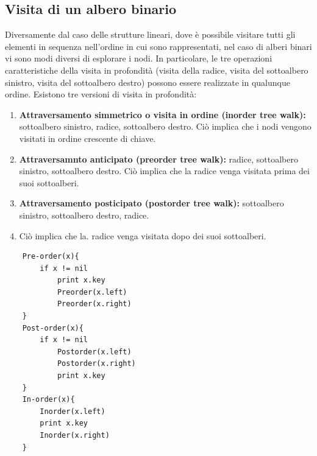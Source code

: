 \subsection{Visita di un albero binario}
Diversamente dal caso delle strutture lineari, dove è possibile visitare tutti gli elementi in
sequenza nell’ordine in cui sono rappresentati, nel caso di alberi binari vi sono modi diversi
di esplorare i nodi. In particolare, le tre operazioni caratteristiche della visita in profondità
(visita della radice, visita del sottoalbero sinistro, visita del sottoalbero destro) possono essere
realizzate in qualunque ordine. Esistono tre versioni di visita in profondità:
\begin{enumerate}
    \item \textbf{Attraversamento simmetrico o visita in ordine (inorder tree walk):} sottoalbero sinistro, 
    radice, sottoalbero destro. Ciò implica che i nodi vengono visitati in ordine crescente di chiave.
    \item \textbf{Attraversamnto anticipato (preorder tree walk):} radice, sottoalbero sinistro,  sottoalbero destro. 
    Ciò implica che la radice venga visitata prima dei suoi sottoalberi.
    \item \textbf{Attraversamento posticipato (postorder tree walk):} sottoalbero sinistro, sottoalbero destro, radice. 
    \item Ciò implica che la. radice venga visitata dopo dei suoi sottoalberi. 
\end{enumerate}
\begin{verbatim}
    Pre-order(x){
        if x != nil
            print x.key
            Preorder(x.left)
            Preorder(x.right)
    }
    Post-order(x){
        if x != nil
            Postorder(x.left)
            Postorder(x.right)
            print x.key
    }
    In-order(x){
        Inorder(x.left)
        print x.key
        Inorder(x.right)
    }
\end{verbatim}
